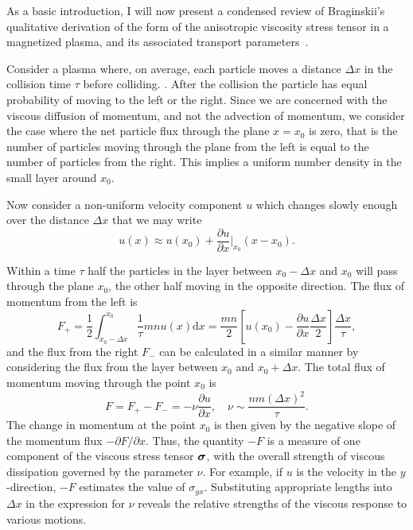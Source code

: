 As a basic introduction, I will now present a condensed review of Braginskii's qualitative derivation of the form of the anisotropic viscosity stress tensor in a magnetized plasma, and its associated transport parameters~\cite{braginskiiTransportProcessesPlasma1965}. 

Consider a plasma where, on average, each particle moves a distance $\Delta x$ in the collision time $\tau$ before colliding. . After the collision the particle has equal probability of moving to the left or the right. Since we are concerned with the viscous diffusion of momentum, and not the advection of momentum, we consider the case where the net particle flux through the plane $x=x_0$ is zero, that is the number of particles moving through the plane from the left is equal to the number of particles from the right. This implies a uniform number density in the small layer around $x_0$.

Now consider a non-uniform velocity component $u$ which changes slowly enough over the distance $\Delta x$ that we may write
\begin{equation}
  \label{eq:viscous_derivation_vy}
u (x) \approx u(x_0) + \frac{\partial u}{\partial x} \bigg| _{x_0} (x - x_0).
\end{equation}

Within a time $\tau$ half the particles in the layer between $x_0 - \Delta x$ and $x_0$ will pass through the plane $x_0$, the other half moving in the opposite direction. The flux of momentum from the left is
\begin{equation}
  \label{eq:momentum_flux_left}
F_{+} = \frac{1}{2} \int^{x_0}_{x_0 - \Delta x} \frac{1}{\tau} m n u(x) \text{d}x = \frac{mn}{2} \left[ u(x_0) - \frac{\partial u}{\partial x} \frac{\Delta x}{2} \right] \frac{\Delta x}{\tau},
\end{equation}
and the flux from the right $F_{-}$ can be calculated in a similar manner by considering the flux from the layer between $x_0$ and $x_0 + \Delta x$. The total flux of momentum moving through the point $x_0$ is
\begin{equation}
  \label{eq:total_momentum_flux}
  F = F_+ - F_- = - \nu \frac{\partial u}{\partial x}, \quad \nu \sim \frac{nm(\Delta x)^2}{\tau}.
\end{equation}
The change in momentum at the point $x_0$ is then given by the negative slope of the momentum flux $- \partial F/\partial x$. Thus, the quantity $-F$ is a measure of one component of the viscous stress tensor ${\bm \sigma}$, with the overall strength of viscous dissipation governed by the parameter $\nu$. For example, if $u$ is the velocity in the $y$-direction, $-F$ estimates the value of $\sigma_{yx}$. Substituting appropriate lengths into $\Delta x$ in the expression for $\nu$ reveals the relative strengths of the viscous response to various motions. 

